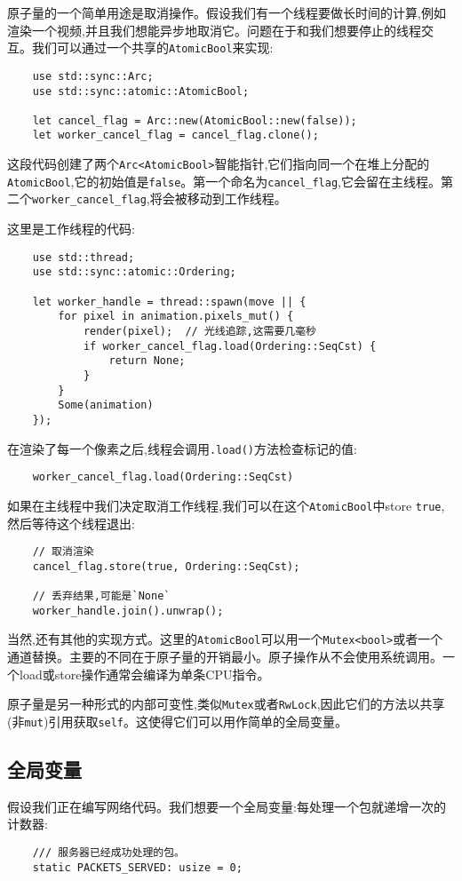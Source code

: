 原子量的一个简单用途是取消操作。假设我们有一个线程要做长时间的计算,例如渲染一个视频,并且我们想能异步地取消它。问题在于和我们想要停止的线程交互。我们可以通过一个共享的\texttt{AtomicBool}来实现:
\begin{verbatim}
    use std::sync::Arc;
    use std::sync::atomic::AtomicBool;

    let cancel_flag = Arc::new(AtomicBool::new(false));
    let worker_cancel_flag = cancel_flag.clone();
\end{verbatim}

这段代码创建了两个\texttt{Arc<AtomicBool>}智能指针,它们指向同一个在堆上分配的\texttt{AtomicBool},它的初始值是\texttt{false}。第一个命名为\texttt{cancel\_flag},它会留在主线程。第二个\texttt{worker\_cancel\_flag},将会被移动到工作线程。

这里是工作线程的代码:
\begin{verbatim}
    use std::thread;
    use std::sync::atomic::Ordering;

    let worker_handle = thread::spawn(move || {
        for pixel in animation.pixels_mut() {
            render(pixel);  // 光线追踪,这需要几毫秒
            if worker_cancel_flag.load(Ordering::SeqCst) {
                return None;
            }
        }
        Some(animation)
    });
\end{verbatim}

在渲染了每一个像素之后,线程会调用\texttt{.load()}方法检查标记的值:
\begin{verbatim}
    worker_cancel_flag.load(Ordering::SeqCst)
\end{verbatim}

如果在主线程中我们决定取消工作线程,我们可以在这个\texttt{AtomicBool}中store \texttt{true},然后等待这个线程退出:
\begin{verbatim}
    // 取消渲染
    cancel_flag.store(true, Ordering::SeqCst);

    // 丢弃结果,可能是`None`
    worker_handle.join().unwrap();
\end{verbatim}

当然,还有其他的实现方式。这里的\texttt{AtomicBool}可以用一个\texttt{Mutex<bool>}或者一个通道替换。主要的不同在于原子量的开销最小。原子操作从不会使用系统调用。一个load或store操作通常会编译为单条CPU指令。

原子量是另一种形式的内部可变性,类似\texttt{Mutex}或者\texttt{RwLock},因此它们的方法以共享(非\texttt{mut})引用获取\texttt{self}。这使得它们可以用作简单的全局变量。

\subsection{全局变量}\label{globalvar}
假设我们正在编写网络代码。我们想要一个全局变量:每处理一个包就递增一次的计数器:
\begin{verbatim}
    /// 服务器已经成功处理的包。
    static PACKETS_SERVED: usize = 0;
\end{verbatim}

